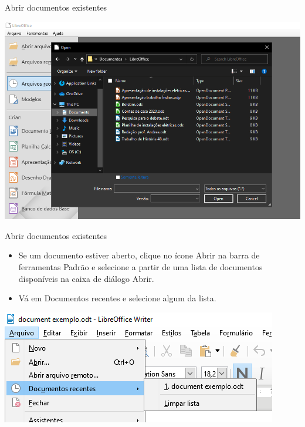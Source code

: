 \begin{frame}{Abrir documentos existentes}

	\centering
	\includegraphics[width=0.9\linewidth]{Figuras/Ch04/fig27}
\end{frame}


\begin{frame}{Abrir documentos existentes}
	\begin{block}{}
		\begin{itemize}
			\item Se um documento estiver aberto, clique no ícone Abrir na barra de ferramentas Padrão e selecione a partir de uma lista de documentos disponíveis na caixa de diálogo Abrir.
			\item Vá em Documentos recentes e selecione algum da lista.
		\end{itemize}
	\end{block}

	\bigskip

	\centering
	\includegraphics[width=0.7\linewidth]{Figuras/Ch04/fig31}
\end{frame}


